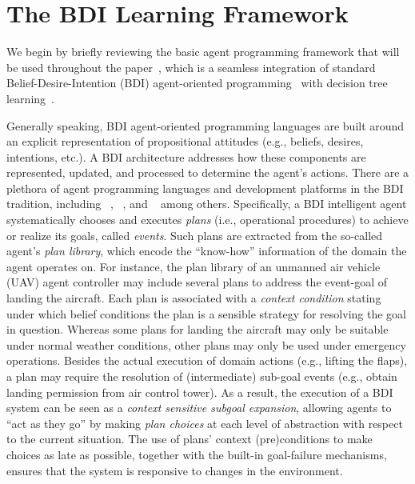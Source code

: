 \newpage 
\section{The BDI Learning Framework}\label{sec:framework}

We begin by briefly reviewing the basic agent programming framework that will be used throughout the paper~\cite{airiau09:enhancing,singh10:extending,singh10:learning}, which is a seamless integration of standard Belief-Desire-Intention (BDI) agent-oriented programming~\cite{Rao96:AgentSpeak,WooldridgeBook} with decision tree learning~\cite{Mitchell97:ML}. 

Generally speaking, BDI agent-oriented programming languages are built around an explicit representation of propositional attitudes (e.g., beliefs, desires, intentions, etc.). A BDI architecture addresses how these components are represented, updated, and processed to determine the agent's actions.
There are a plethora of agent programming languages and development platforms in the BDI tradition, including
\JACK~\cite{BusettaRHL:AL99-JACK}, 
\JADEX~\cite{Pokahr:EXP03-JADEX}, and
\JASON~\cite{jasonbook}
among others. 
Specifically, a BDI intelligent agent systematically chooses and executes \emph{plans} (i.e., operational procedures) to achieve or realize its goals, called \emph{events}.
Such plans are extracted from the so-called agent's \emph{plan library}, which encode the ``know-how'' information of the domain the agent operates on.
For instance, the plan library of an unmanned air vehicle (UAV) agent controller may include several plans to address the event-goal of landing the aircraft. Each plan is associated with a \emph{context condition} stating under which belief conditions the plan is a sensible strategy for resolving the goal in question. Whereas some plans for landing the aircraft may only be suitable under normal weather conditions, other plans may only be used under emergency operations.
Besides the actual execution of domain actions (e.g., lifting the flaps), a plan may require the resolution of (intermediate) sub-goal events (e.g., obtain landing permission from air control tower). As a result, the execution of a BDI system can be seen as a \textit{context sensitive subgoal expansion}, allowing agents to ``act as they go'' by making \emph{plan choices} at each level of abstraction with respect to the current situation. The use of plans' context (pre)conditions to make choices as late as possible, together with the built-in goal-failure mechanisms, ensures that the system is responsive to changes in the environment. 




